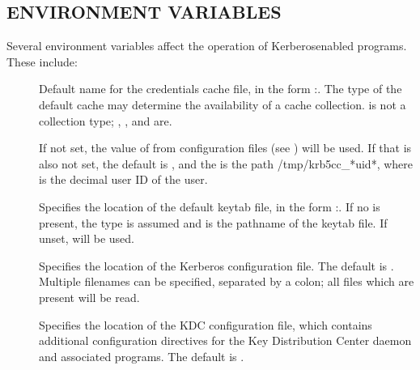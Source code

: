 \documentclass[letterpaper,10pt,english]{sphinxmanual}
\begin{document}
\subsection{ENVIRONMENT VARIABLES}
\label{\detokenize{user/user_config/kerberos:environment-variables}}
\sphinxAtStartPar
Several environment variables affect the operation of Kerberos\sphinxhyphen{}enabled
programs.  These include:
\begin{description}
\item[{}] \leavevmode
\sphinxAtStartPar
Default name for the credentials cache file, in the form
:.  The type of the default cache may determine
the availability of a cache collection.   is not a
collection type; , , and  are.

\sphinxAtStartPar
If not set, the value of  from
configuration files (see ) will be used.  If that
is also not set, the default  is , and the
 is the path /tmp/krb5cc\_*uid*, where  is the
decimal user ID of the user.

\item[{}] \leavevmode
\sphinxAtStartPar
Specifies the location of the default keytab file, in the form
:.  If no  is present, the  type is
assumed and  is the pathname of the keytab file.  If
unset,  will be used.

\item[{}] \leavevmode
\sphinxAtStartPar
Specifies the location of the Kerberos configuration file.  The
default is .  Multiple filenames can
be specified, separated by a colon; all files which are present
will be read.

\item[{}] \leavevmode
\sphinxAtStartPar
Specifies the location of the KDC configuration file, which
contains additional configuration directives for the Key
Distribution Center daemon and associated programs.  The default
is .


\end{description}
\end{document}
